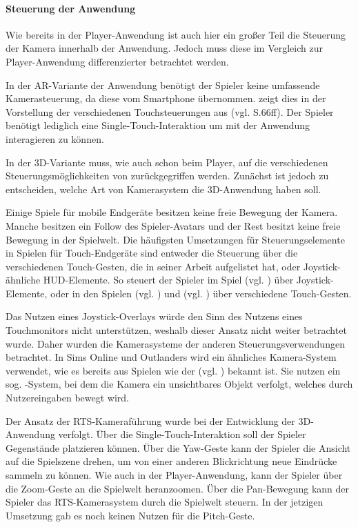 \paragraph{Steuerung der Anwendung}
Wie bereits in der Player-Anwendung ist auch hier ein großer Teil die Steuerung der Kamera innerhalb der Anwendung. Jedoch muss diese im Vergleich zur Player-Anwendung differenzierter betrachtet werden. 

In der \ac{AR}-Variante der Anwendung benötigt der Spieler keine umfassende Kamerasteuerung, da diese vom Smartphone  übernommen. \cite{reinhard_augmented_2022} zeigt dies in der Vorstellung der verschiedenen Touchsteuerungen aus (vgl. S.66ff). Der Spieler benötigt lediglich eine Single-Touch-Interaktion um mit der Anwendung interagieren zu können.

In der \ac{3D}-Variante muss, wie auch schon beim Player, auf die verschiedenen Steuerungsmöglichkeiten von \cite{reinhard_augmented_2022} zurückgegriffen werden. Zunächst ist jedoch zu entscheiden, welche Art von Kamerasystem die \ac{3D}-Anwendung haben soll. 

Einige Spiele für mobile Endgeräte besitzen keine freie Bewegung der Kamera. Manche besitzen ein Follow des Spieler-Avatars und der Rest besitzt keine freie Bewegung in der Spielwelt. Die häufigsten Umsetzungen für Steuerungselemente in Spielen für Touch-Endgeräte sind entweder die Steuerung über die verschiedenen Touch-Gesten, die \cite{reinhard_augmented_2022} in seiner Arbeit aufgelistet hat, oder Joystick-ähnliche \ac{HUD}-Elemente. 
So steuert der Spieler im Spiel  (vgl. \cite{noauthor_botworld_nodate}) über Joystick-Elemente, oder in den Spielen  (vgl. \cite{arts_sims_2017}) und  (vgl. \cite{noauthor_outlanders_2025}) über verschiedene Touch-Gesten. 

Das Nutzen eines Joystick-Overlays würde den Sinn des Nutzens eines Touchmonitors nicht unterstützen, weshalb dieser Ansatz nicht weiter betrachtet wurde. Daher wurden die Kamerasysteme der anderen Steuerungsverwendungen betrachtet. In Sims Online und Outlanders wird ein ähnliches Kamera-System verwendet, wie es bereits aus Spielen wie der  (vgl. \cite{noauthor_ubisoft_nodate}) bekannt ist. Sie nutzen ein sog. -System, bei dem die Kamera ein unsichtbares Objekt verfolgt, welches durch Nutzereingaben bewegt wird.

Der Ansatz der \ac{RTS}-Kameraführung wurde bei der Entwicklung der \ac{3D}-Anwendung verfolgt. Über die Single-Touch-Interaktion soll der Spieler Gegenstände platzieren können. Über die Yaw-Geste kann der Spieler die Ansicht auf die Spielszene drehen, um von einer anderen Blickrichtung neue Eindrücke sammeln zu können. Wie auch in der Player-Anwendung, kann der Spieler über die Zoom-Geste an die Spielwelt heranzoomen. Über die Pan-Bewegung kann der Spieler das \ac{RTS}-Kamerasystem durch die Spielwelt steuern. In der jetzigen Umsetzung gab es noch keinen Nutzen für die Pitch-Geste.

